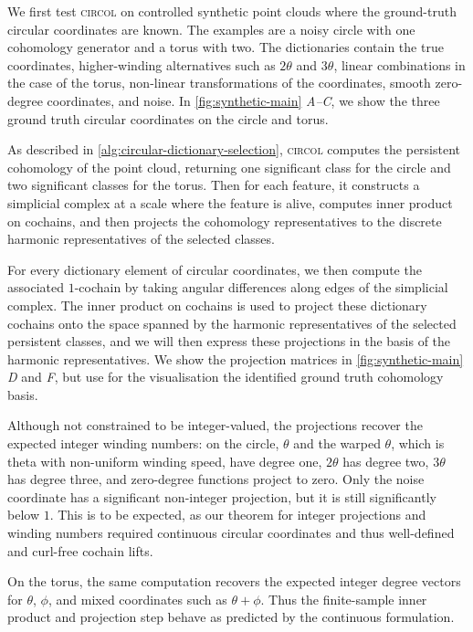 \documentclass[a4paper,11pt, DIV=10]{scrartcl}
\numberwithin{equation}{section}
\theoremstyle{definition}
\theoremstyle{remark}
\begin{document}
We first test \textsc{circol} on controlled synthetic point clouds where the ground-truth circular coordinates are known.
The examples are a noisy circle with one cohomology generator and a torus with two.
The dictionaries contain the true coordinates, higher-winding alternatives such as $2\theta$ and $3\theta$, linear combinations in the case of the torus, non-linear transformations of the coordinates, smooth zero-degree coordinates, and noise.
In \cref{fig:synthetic-main} \emph{A--C}, we show the three ground truth circular coordinates on the circle and torus.

As described in \cref{alg:circular-dictionary-selection}, \textsc{circol} computes the persistent cohomology of the point cloud, returning one significant class for the circle and two significant classes for the torus.
Then for each feature, it constructs a simplicial complex at a scale where the feature is alive, computes inner product on cochains, and then projects the cohomology representatives to the discrete harmonic representatives of the selected classes.

For every dictionary element of circular coordinates, we then compute the associated $1$-cochain by taking angular differences along edges of the simplicial complex.
The inner product on cochains is used to project these dictionary cochains onto the space spanned by the harmonic representatives of the selected persistent classes, and we will then express these projections in the basis of the harmonic representatives.
We show the projection matrices in \cref{fig:synthetic-main} \emph{D} and \emph{F}, but use for the visualisation the identified ground truth cohomology basis.

Although not constrained to be integer-valued, the projections recover the expected integer winding numbers: on the circle, $\theta$ and the warped $\theta$, which is theta with non-uniform winding speed, have degree one, $2\theta$ has degree two, $3\theta$ has degree three, and zero-degree functions project to zero.
Only the noise coordinate has a significant non-integer projection, but it is still significantly below $1$.
This is to be expected, as our theorem for integer projections and winding numbers required continuous circular coordinates and thus well-defined and curl-free cochain lifts.

On the torus, the same computation recovers the expected integer degree vectors for $\theta$, $\phi$, and mixed coordinates such as $\theta+\phi$.
Thus the finite-sample inner product and projection step behave as predicted by the continuous formulation.
\end{document}
